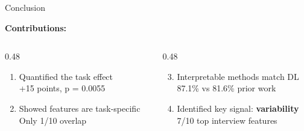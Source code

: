 \documentclass[aspectratio=169,11pt]{beamer}
\begin{document}
\begin{frame}{Conclusion}
    \begin{center}
    \end{center}
    
    \vspace{0.5cm}
    
    \textbf{\color{uofgblue} Contributions:}
    
    \vspace{0.2cm}
    
    \begin{columns}[T]
        \begin{column}{0.48\textwidth}
            \begin{enumerate}
                \item Quantified the task effect\\
                      \small\color{darkgrey} +15 points, p = 0.0055
                      
                \vspace{0.15cm}
                      
                \item \normalsize\color{black}Showed features are task-specific\\
                      \small\color{darkgrey} Only 1/10 overlap
            \end{enumerate}
        \end{column}
        
        \begin{column}{0.48\textwidth}
            \begin{enumerate}
                \setcounter{enumi}{2}
                \item Interpretable methods match DL\\
                      \small\color{darkgrey} 87.1\% vs 81.6\% prior work
                      
                \vspace{0.15cm}
                      
                \item \normalsize\color{black}Identified key signal: \textbf{variability}\\
                      \small\color{darkgrey} 7/10 top interview features
            \end{enumerate}
        \end{column}
    \end{columns}
\end{frame}
\end{document}
